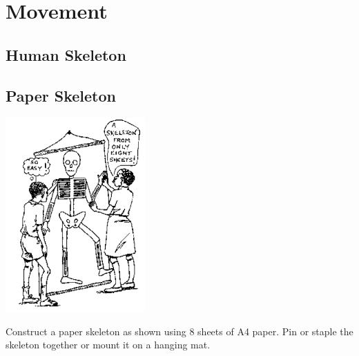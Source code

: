 \section{Movement}

\begin{multicols}{2}


\section*{Human Skeleton}


\subsection{Paper Skeleton} %

\begin{center}
\includegraphics[width=0.4\textwidth]{./img/source/skeleton-full.png}
\end{center}
Construct a paper skeleton as shown using 8 sheets of A4 paper. Pin or staple the skeleton together or mount it on a hanging mat.


\end{multicols}
